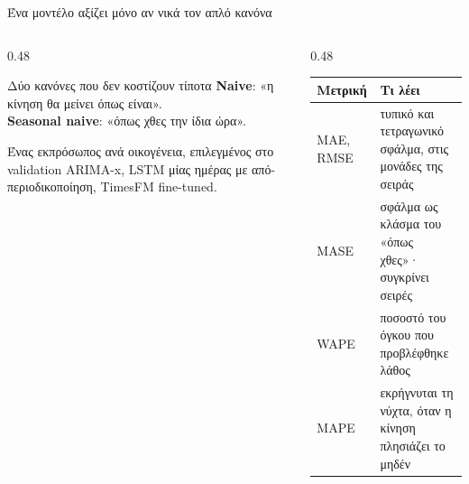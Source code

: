 \documentclass[aspectratio=169,10pt]{beamer}
\newcommand{\muted}[1]{\textcolor{muted}{#1}}
\begin{document}
\begin{frame}{Ένα μοντέλο αξίζει μόνο αν νικά τον απλό κανόνα}
  \begin{columns}[T, onlytextwidth]
    \begin{column}{0.48\textwidth}
      \begin{block}{Δύο κανόνες που δεν κοστίζουν τίποτα}
        \textbf{Naive}: «η κίνηση θα μείνει όπως είναι».\\
        \textbf{Seasonal naive}: «όπως χθες την ίδια ώρα».
      \end{block}
      \begin{block}{Ένας εκπρόσωπος ανά οικογένεια, επιλεγμένος στο validation}
        ARIMA-x, LSTM μίας ημέρας με από-περιοδικοποίηση, TimesFM fine-tuned.
      \end{block}
    \end{column}
    \begin{column}{0.48\textwidth}
      \small
      \begin{tabular}{@{}>{\raggedright\arraybackslash}p{}>{\raggedright\arraybackslash}p{}@{}}
        \toprule
        Μετρική & Τι λέει \\
        \midrule
        MAE, RMSE & τυπικό και τετραγωνικό σφάλμα, στις μονάδες της σειράς \\
        MASE & σφάλμα ως κλάσμα του «όπως χθες»· συγκρίνει σειρές \\
        WAPE & ποσοστό του όγκου που προβλέφθηκε λάθος \\
        MAPE & \muted{εκρήγνυται τη νύχτα, όταν η κίνηση πλησιάζει το μηδέν} \\
        \bottomrule
      \end{tabular}
    \end{column}
  \end{columns}
\end{frame}
\end{document}
